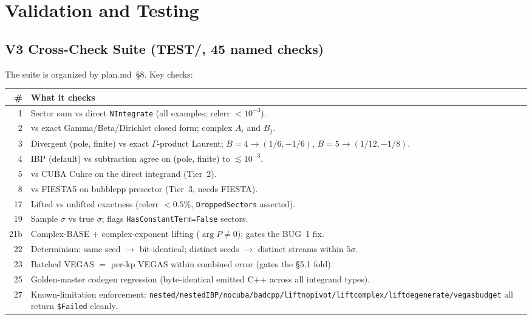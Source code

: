 \documentclass[11pt,a4paper]{article}
\begin{document}
\section{Validation and Testing}

\subsection{V3 Cross-Check Suite (TEST/, 45 named checks)}

The suite is organized by plan.md~\S8. Key checks:

\begin{center}
\begin{tabular}{rp{11cm}}
\toprule
\textbf{\#} & \textbf{What it checks} \\
\midrule
1 & Sector sum vs direct \texttt{NIntegrate} (all examples; relerr $<10^{-3}$). \\
2 & vs exact Gamma/Beta/Dirichlet closed form; complex $A_i$ and $B_j$. \\
3 & Divergent (pole, finite) vs exact $\Gamma$-product Laurent; $B{=}4\to(1/6,-1/6)$, $B{=}5\to(1/12,-1/8)$. \\
4 & IBP (default) vs subtraction agree on (pole, finite) to $\lesssim10^{-3}$. \\
5 & vs CUBA Cuhre on the direct integrand (Tier~2). \\
8 & vs FIESTA5 on bubblepp presector (Tier~3, needs FIESTA). \\
17 & Lifted vs unlifted exactness (relerr $<0.5\%$, \texttt{DroppedSectors} asserted). \\
19 & Sample $\sigma$ vs true $\sigma$; flags \texttt{HasConstantTerm=False} sectors. \\
21b & Complex-BASE + complex-exponent lifting ($\arg P\neq 0$); gates the BUG~1 fix. \\
22 & Determinism: same seed $\to$ bit-identical; distinct seeds $\to$ distinct streams within $5\sigma$. \\
23 & Batched VEGAS $=$ per-kp VEGAS within combined error (gates the \S5.1 fold). \\
25 & Golden-master codegen regression (byte-identical emitted C++ across all integrand types). \\
27 & Known-limitation enforcement: \texttt{nested/nestedIBP/nocuba/badcpp/liftnopivot/liftcomplex/liftdegenerate/vegasbudget} all return \texttt{\$Failed} cleanly. \\

\end{tabular}
\end{center}
\end{document}
